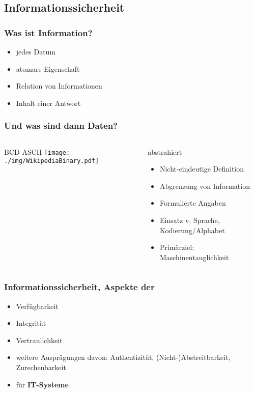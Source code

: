 \documentclass[12pt]{beamer}
\begin{document}
\subsection{Informationssicherheit}

\begin{frame}
	\frametitle{Was ist Information?}
	\begin{itemize}
		\item jedes Datum
		\item atomare Eigenschaft
		\item Relation von Informationen
		\item Inhalt einer Antwort
	\end{itemize}
\end{frame}

\begin{frame}
	\frametitle{Und was sind dann Daten?}

\begin{columns}[T]
    \begin{column}{.3\textwidth}
    \begin{block}{BCD ASCII}
		\texttt{[image: ./img/WikipediaBinary.pdf]}
    \end{block}
    \end{column}
    \begin{column}{.7\textwidth}
     \begin{block}{abstrahiert}
	\begin{itemize}
		\item Nicht-eindeutige Definition
		\item Abgrenzung von Information
		\item Formulierte Angaben
		\item Einsatz v. Sprache, Kodierung/Alphabet
		\item Primärziel: Maschinentauglichkeit
	\end{itemize}
    \end{block}
    \end{column}
  \end{columns}

\end{frame}

\begin{frame}
	\frametitle{Informationssicherheit, Aspekte der}
	\begin{itemize}
		\item Verfügbarkeit
		\item Integrität
		\item Vertraulichkeit
		\item weitere Ausprägungen davon: Authentizität, (Nicht-)Abstreitbarkeit, Zurechenbarkeit
		\item für \textbf{IT-Systeme}
	\end{itemize}
\end{frame}
\end{document}
